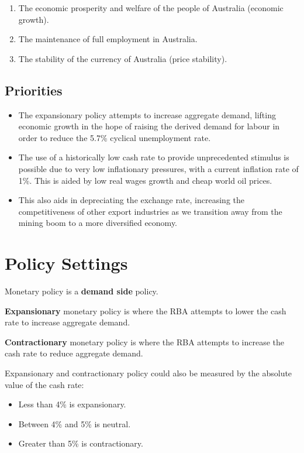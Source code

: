 \documentclass[a4paper,11pt]{report}
\begin{document}
\begin{enumerate}
\item The economic prosperity and welfare of the people of Australia (economic
	growth).
\item The maintenance of full employment in Australia.
\item The stability of the currency of Australia (price stability).
\end{enumerate}

\subsection{Priorities}

\begin{itemize}
\item The expansionary policy attempts to increase aggregate demand, lifting
	economic growth in the hope of raising the derived demand for labour in
	order to reduce the 5.7\% cyclical unemployment rate.
\item The use of a historically low cash rate to provide unprecedented stimulus
	is possible due to very low inflationary pressures, with a current inflation
	rate of 1\%. This is aided by low real wages growth and cheap world oil
	prices.
\item This also aids in depreciating the exchange rate, increasing the
	competitiveness of other export industries as we transition away from the
	mining boom to a more diversified economy.
\end{itemize}


\section{Policy Settings}

Monetary policy is a \textbf{demand side} policy.

\textbf{Expansionary} monetary policy is where the RBA attempts to lower the
cash rate to increase aggregate demand.

\textbf{Contractionary} monetary policy is where the RBA attempts to increase
the cash rate to reduce aggregate demand.

Expansionary and contractionary policy could also be measured by the absolute
value of the cash rate:

\begin{itemize}
\item Less than 4\% is expansionary.
\item Between 4\% and 5\% is neutral.
\item Greater than 5\% is contractionary.
\end{itemize}
\end{document}
